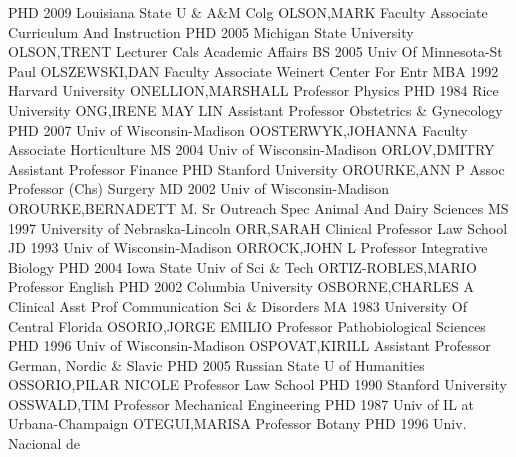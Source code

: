 \documentclass[
]{article}
\begin{document}
\textbar PHD 2009 Louisiana State U \& A\&M Colg \textbar OLSON,MARK
\textbar{}  \textbar Faculty Associate \textbar Curriculum
And Instruction \textbar PHD 2005 Michigan State University
\textbar OLSON,TRENT \textbar{}  \textbar Lecturer
\textbar Cals Academic Affairs \textbar BS 2005 Univ Of Minnesota-St
Paul \textbar OLSZEWSKI,DAN \textbar{}  \textbar Faculty
Associate \textbar Weinert Center For Entr \textbar MBA 1992 Harvard
University \textbar ONELLION,MARSHALL \textbar{} 
\textbar Professor \textbar Physics \textbar PHD 1984 Rice University
\textbar ONG,IRENE MAY LIN \textbar{}  \textbar Assistant
Professor \textbar Obstetrics \& Gynecology \textbar PHD 2007 Univ of
Wisconsin-Madison \textbar OOSTERWYK,JOHANNA \textbar{} 
\textbar Faculty Associate \textbar Horticulture \textbar MS 2004 Univ
of Wisconsin-Madison \textbar ORLOV,DMITRY \textbar{} 
\textbar Assistant Professor \textbar Finance \textbar PHD Stanford
University \textbar OROURKE,ANN P \textbar{}  \textbar Assoc
Professor (Chs) \textbar Surgery \textbar MD 2002 Univ of
Wisconsin-Madison \textbar OROURKE,BERNADETT M. \textbar{} 
\textbar Sr Outreach Spec \textbar Animal And Dairy Sciences \textbar MS
1997 University of Nebraska-Lincoln \textbar ORR,SARAH \textbar{}
 \textbar Clinical Professor \textbar Law School \textbar JD
1993 Univ of Wisconsin-Madison \textbar ORROCK,JOHN L \textbar{}
 \textbar Professor \textbar Integrative Biology
\textbar PHD 2004 Iowa State Univ of Sci \& Tech
\textbar ORTIZ-ROBLES,MARIO \textbar{}  \textbar Professor
\textbar English \textbar PHD 2002 Columbia University
\textbar OSBORNE,CHARLES A \textbar{}  \textbar Clinical
Asst Prof \textbar Communication Sci \& Disorders \textbar MA 1983
University Of Central Florida \textbar OSORIO,JORGE EMILIO \textbar{}
 \textbar Professor \textbar Pathobiological Sciences
\textbar PHD 1996 Univ of Wisconsin-Madison \textbar OSPOVAT,KIRILL
\textbar{}  \textbar Assistant Professor \textbar German,
Nordic \& Slavic \textbar PHD 2005 Russian State U of Humanities
\textbar OSSORIO,PILAR NICOLE \textbar{}  \textbar Professor
\textbar Law School \textbar PHD 1990 Stanford University
\textbar OSSWALD,TIM \textbar{}  \textbar Professor
\textbar Mechanical Engineering \textbar PHD 1987 Univ of IL at
Urbana-Champaign \textbar OTEGUI,MARISA \textbar{} 
\textbar Professor \textbar Botany \textbar PHD 1996 Univ. Nacional de
\end{document}
